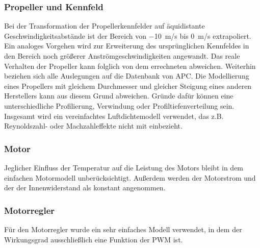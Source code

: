 \subsubsection{Propeller und Kennfeld}
Bei der Transformation der Propellerkennfelder auf äquidistante Geschwindigkeitsabstände ist der Bereich von \SI{-10}{m/s} bis \SI{0}{m/s} extrapoliert. Ein analoges Vorgehen wird zur Erweiterung des ursprünglichen Kennfeldes in den Bereich noch größerer Anströmgeschwindigkeiten angewandt. Das reale Verhalten der Propeller kann folglich von dem errechneten abweichen. Weiterhin beziehen sich alle Auslegungen auf die Datenbank von APC. 
Die Modellierung eines Propellers mit gleichem Durchmesser und gleicher Steigung eines anderen Herstellers kann aus diesem Grund abweichen. Gründe dafür können eine unterschiedliche Profilierung, Verwindung oder Profiltiefenverteilung sein. Insgesamt wird ein vereinfachtes Luftdichtemodell verwendet, das z.B. Reynoldszahl- oder Machzahleffekte nicht mit einbezieht.

\subsubsection{Motor}
Jeglicher Einfluss der Temperatur auf die Leistung des Motors bleibt in dem einfachen Motormodell unberücksichtigt. Außerdem werden der Motorstrom und der der Innenwiderstand als konstant angenommen.

\subsubsection{Motorregler}
Für den Motorregler wurde ein sehr einfaches Modell verwendet, in dem der Wirkungsgrad ausschließlich eine Funktion der PWM ist.

